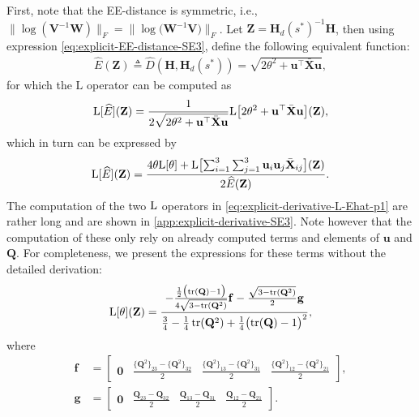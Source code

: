 First, note that the EE-distance is symmetric, i.e., $\bigl\|\log(\mathbf{V}^{-1}\mathbf{W})\bigr\|_F = \bigl\|\log\bigl(\mathbf{W}^{-1}\mathbf{V}\bigr)\bigr\|_F$. Let $\mathbf{Z}=\mathbf{H}_d(s^*)^{-1}\mathbf{H}$, then using expression \eqref{eq:explicit-EE-distance-SE3}, define the following equivalent function:
\begin{align}
    \widehat{E}(\mathbf{Z}) \triangleq \widehat{D}(\mathbf{H}, \mathbf{H}_d(s^*)) = \sqrt{2\theta^2 + \mathbf{u}^\top\bar{\mathbf{X}}\mathbf{u}},
    \label{eq:explicit-EE-dista-SE3-component-Ehat}
\end{align}
for which the $\text{L}$ operator can be computed as
\begin{align}
    \operatorname{L}[\widehat{E}](\mathbf{Z}) = \frac{1}{2 \sqrt{2\theta^2 + \mathbf{u}^\top\bar{\mathbf{X}}\mathbf{u}}}\text{L}\bigl[2\theta^2 + \mathbf{u}^\top\bar{\mathbf{X}}\mathbf{u}\bigr](\mathbf{Z}),
\end{align}
which in turn can be expressed by 
\begin{align}
    \operatorname{L}[\widehat{E}](\mathbf{Z}) = \frac{4\theta\text{L}[\theta] + \operatorname{L}\bigl[\sum_{i=1}^{3}\sum_{j=1}^{3}\mathbf{u}_i\mathbf{u}_j\bar{\mathbf{X}}_{ij}\bigr](\mathbf{Z})}{2 \widehat{E}(\mathbf{Z})}. \label{eq:explicit-derivative-L-Ehat-p1}
\end{align}
The computation of the two $\operatorname{L}$ operators in \eqref{eq:explicit-derivative-L-Ehat-p1} are rather long and are shown in \cref{app:explicit-derivative-SE3}. Note however that the computation of these only rely on already computed terms and elements of $\mathbf{u}$ and $\mathbf{Q}$. For completeness, we present the expressions for these terms without the detailed derivation:
\begin{align}
    \text{L}[\theta](\mathbf{Z}) = \frac{
        -\frac{\frac{1}{2}\bigl(\operatorname{tr}(\mathbf{Q})-1\bigr)}{4\sqrt{3 - \operatorname{tr}(\mathbf{Q}^2)}}\mathbf{f} -
    \frac{\sqrt{3 - \operatorname{tr}(\mathbf{Q}^2)}}{2}\mathbf{g}}
    {\frac{3}{4} - \frac{1}{4}\operatorname{tr}(\mathbf{Q}^2)+\frac{1}{4}\bigl(\operatorname{tr}(\mathbf{Q})-1\bigr)^2},
    \label{eq:explicit-EE-dista-SE3-component-Ltheta}
\end{align}
where 
\begin{align}
    \mathbf{f} &= \begin{bmatrix}
        \mathbf{0}& \frac{\{\mathbf{Q}^2\}_{23}-\{\mathbf{Q}^2\}_{32}}{2} & \frac{\{\mathbf{Q}^2\}_{13} - \{\mathbf{Q}^2\}_{31}}{2} & \frac{\{\mathbf{Q}^2\}_{12}-\{\mathbf{Q}^2\}_{21}}{2}
    \end{bmatrix},\label{eq:explicit-EE-dista-SE3-component-fvec}\\
    \mathbf{g} &= \begin{bmatrix}
        \mathbf{0}& \frac{\mathbf{Q}_{23}-\mathbf{Q}_{32}}{2} & \frac{\mathbf{Q}_{13} - \mathbf{Q}_{31}}{2} & \frac{\mathbf{Q}_{12}-\mathbf{Q}_{21}}{2}
    \end{bmatrix} \label{eq:explicit-EE-dista-SE3-component-gvec}.
\end{align}
